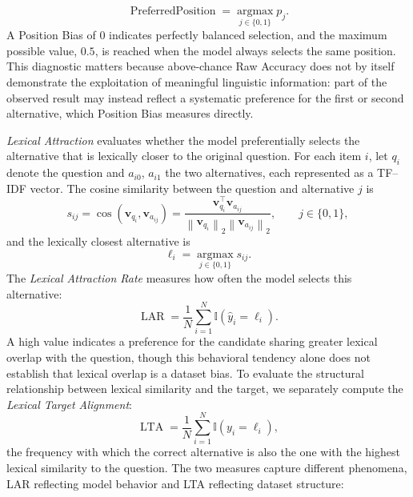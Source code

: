 \begin{description}
\begin{equation}
\operatorname{PreferredPosition} = \operatorname*{argmax}_{j \in \{0,1\}} p_j.
\end{equation}
A Position Bias of \(0\) indicates perfectly balanced selection, and the maximum possible value, \(0.5\), is reached when the model always selects the same position. This diagnostic matters because above-chance Raw Accuracy does not by itself demonstrate the exploitation of meaningful linguistic information: part of the observed result may instead reflect a systematic preference for the first or second alternative, which Position Bias measures directly.
\item[Lexical Attraction] \textit{Lexical Attraction} evaluates whether the model preferentially selects the alternative that is lexically closer to the original question. For each item \(i\), let \(q_i\) denote the question and \(a_{i0}\), \(a_{i1}\) the two alternatives, each represented as a TF--IDF vector. The cosine similarity between the question and alternative \(j\) is
\begin{equation}
s_{ij} = \cos \left(\mathbf{v}_{q_i}, \mathbf{v}_{a_{ij}}\right) = \frac{\mathbf{v}_{q_i}^{\top} \mathbf{v}_{a_{ij}}}{\left\|\mathbf{v}_{q_i}\right\|_2 \left\|\mathbf{v}_{a_{ij}}\right\|_2}, \qquad j \in \{0,1\},
\end{equation}
and the lexically closest alternative is
\begin{equation}
\ell_i = \operatorname*{argmax}_{j \in \{0,1\}} s_{ij}.
\end{equation}
The \textit{Lexical Attraction Rate} measures how often the model selects this alternative:
\begin{equation}
\operatorname{LAR} = \frac{1}{N} \sum_{i=1}^{N} \mathbb{I} \left(\hat{y}_i = \ell_i\right).
\end{equation}
A high value indicates a preference for the candidate sharing greater lexical overlap with the question, though this behavioral tendency alone does not establish that lexical overlap is a dataset bias. To evaluate the structural relationship between lexical similarity and the target, we separately compute the \textit{Lexical Target Alignment}:
\begin{equation}
\operatorname{LTA} = \frac{1}{N} \sum_{i=1}^{N} \mathbb{I} \left(y_i = \ell_i\right),
\end{equation}
the frequency with which the correct alternative is also the one with the highest lexical similarity to the question. The two measures capture different phenomena, LAR reflecting model behavior and LTA reflecting dataset structure:

\end{description}
